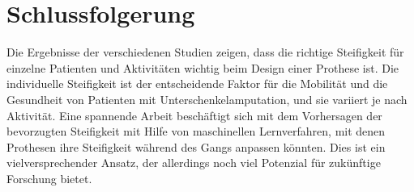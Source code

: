 \section{Schlussfolgerung}
Die Ergebnisse der verschiedenen Studien zeigen, dass die richtige Steifigkeit für einzelne Patienten und Aktivitäten wichtig beim Design einer Prothese ist. Die individuelle Steifigkeit ist der entscheidende Faktor für die Mobilität und die Gesundheit von Patienten mit Unterschenkelamputation, und sie variiert je nach Aktivität. Eine spannende Arbeit beschäftigt sich mit dem Vorhersagen der bevorzugten Steifigkeit mit Hilfe von maschinellen Lernverfahren, mit denen Prothesen ihre Steifigkeit während des Gangs anpassen könnten. Dies ist ein vielversprechender Ansatz, der allerdings noch viel Potenzial für zukünftige Forschung bietet. 


